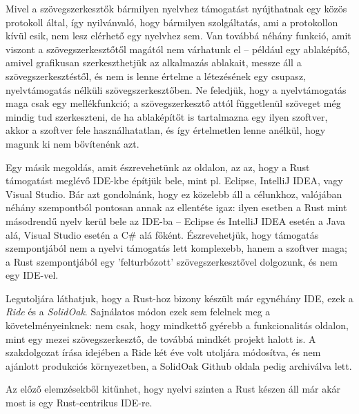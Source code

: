 Mivel a szövegszerkesztők bármilyen nyelvhez támogatást nyújthatnak egy közös protokoll által, így nyilvánvaló, hogy bármilyen szolgáltatás, ami a protokollon kívül esik, nem lesz elérhető egy nyelvhez sem. Van továbbá néhány funkció, amit viszont a szövegszerkesztőtől magától nem várhatunk el -- például egy ablaképítő, amivel gra\-fi\-ku\-san szerkeszthetjük az alkalmazás ablakait, messze áll a szövegszerkesztéstől, és nem is lenne értelme a létezésének egy csupasz, nyelvtámogatás nélküli szövegszerkesztőben. Ne feledjük, hogy a nyelvtámogatás maga csak egy mellékfunkció; a szövegszerkesztő attól függetlenül szöveget még mindig tud szerkeszteni, de ha ablaképítőt is tartalmazna egy ilyen szoftver, akkor a szoftver fele használhatatlan, és így értelmetlen lenne anélkül, hogy magunk ki nem bővítenénk azt.

Egy másik megoldás, amit észrevehetünk az oldalon, az az, hogy a Rust támogatást meglévő IDE-kbe építjük bele, mint pl. Eclipse, IntelliJ IDEA, vagy Visual Studio. Bár azt gondolnánk, hogy ez közelebb áll a célunkhoz, valójában néhány szempontból pontosan annak az ellentéte igaz: ilyen esetben a Rust mint másodrendű nyelv kerül bele az IDE-ba -- Eclipse és IntelliJ IDEA esetén a Java alá, Visual Studio esetén a C\# alá főként. Észrevehetjük, hogy támogatás szempontjából nem a nyelvi támogatás lett komplexebb, hanem a szoftver maga; a Rust szempontjából egy 'felturbózott' szövegszerkesztővel dolgozunk, és nem egy IDE-vel.

Legutoljára láthatjuk, hogy a Rust-hoz bizony készült már egynéhány IDE, ezek a \emph{Ride}\cite{ride} és a \emph{SolidOak}\cite{solidoak}. Sajnálatos módon ezek sem felelnek meg a követel\-mé\-nye\-ink\-nek: nem csak, hogy mindkettő gyérebb a funkcionalitás oldalon, mint egy mezei szö\-veg\-szer\-kesz\-tő, de továbbá mindkét projekt halott is. A szakdolgozat írása idejében a Ride két éve volt utoljára módosítva, és nem ajánlott produkciós környezetben, a SolidOak Github oldala pedig archiválva lett.


Az előző elemzésekből kitűnhet, hogy nyelvi szinten a Rust készen áll már akár most is egy Rust-centrikus IDE-re. %


